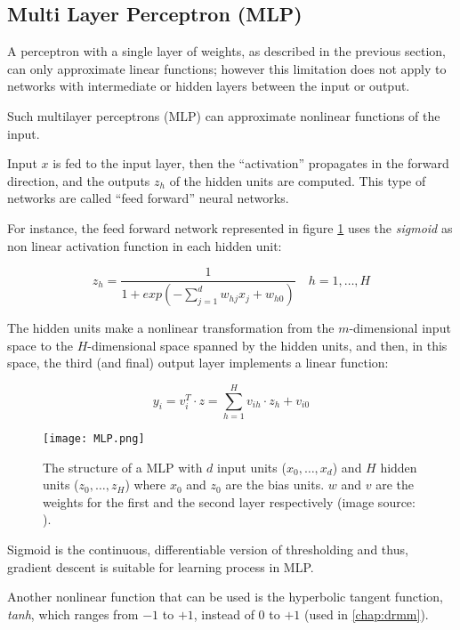 \subsection{Multi Layer Perceptron (MLP)}

A perceptron with a single layer of weights, as described in the previous section, can only approximate linear functions; however this limitation does not apply to networks with intermediate or hidden layers between the input or output.
 
Such multilayer perceptrons (MLP) can approximate nonlinear functions of the input.

Input $x$ is fed to the input layer, then the ``activation'' propagates in the forward direction, and the outputs $z_h$ of the hidden units are computed. This type of networks are called ``feed forward'' neural networks.

For instance, the feed forward network represented in figure \ref{fig:ffnn} uses the \textit{sigmoid} as non linear activation function in each hidden unit:

\begin{equation}
    \tag{Sigmoid function}
    z_h = \frac{1}{1 + exp(- \sum_{j=1}^d w_{hj} x_j + w_{h0})} \quad h = 1, \dots, H
\end{equation}

The hidden units make a nonlinear transformation from the $m$-dimensional input space to the $H$-dimensional space spanned by the hidden units, and then, in this space, the third (and final) output layer implements a linear function:

\begin{equation}
    y_i = v_i^T \cdot z = \sum_{h = 1}^H v_{ih} \cdot z_h + v_{i0}
\end{equation}

\begin{figure}[H]
  \centering
  \texttt{[image: MLP.png]}
  \caption{The structure of a MLP with $d$ input units ($x_0, \dots, x_d$) and $H$ hidden units ($z_0, \dots, z_H$) where $x_0$ and $z_0$ are the bias units. $w$ and $v$ are the weights for the first and the second layer respectively (image source: \cite{ml}).}
  \label{fig:ffnn}
\end{figure}

Sigmoid is the continuous, differentiable version of thresholding and thus, gradient descent is suitable for learning process in MLP.

Another nonlinear function that can be used is the hyperbolic tangent function, \textit{tanh}, which ranges from $-1$ to $+1$, instead of $0$ to $+1$ (used in \ref{chap:drmm}).

